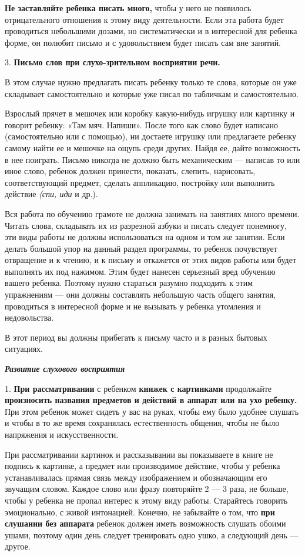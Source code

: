 \documentclass[a5paper]{book}
\renewcommand{\emph}[1]{\textit{#1}}
\begin{document}
\textbf{Не заставляйте ребенка писать много,} чтобы у него не появилось
отрицательного отношения к этому виду деятельности. Если эта работа
будет проводиться небольшими дозами, но систематически и в интересной
для ребенка форме, он полюбит письмо и с удовольствием будет писать сам
вне занятий.

3. \textbf{Письмо слов при слухо-зрительном восприятии речи.}

В этом случае нужно предлагать писать ребенку только те слова, которые
он уже складывает самостоятельно и которые уже писал по табличкам и
самостоятельно.

Взрослый прячет в мешочек или коробку какую-нибудь игрушку или картинку
и говорит ребенку: «Там мяч. Напиши». После того как слово будет
написано (самостоятельно или с помощью), ни достаете игрушку или
предлагаете ребенку самому найти ее и мешочке на ощупь среди других.
Найдя ее, дайте возможность в нее поиграть. Письмо никогда не должно
быть механическим --- написав то или иное слово, ребенок должен
принести, показать, слепить, нарисовать, соответствующий предмет,
сделать аппликацию, постройку или выполнить действие \emph{(спи, иди} и
др.).

Вся работа по обучению грамоте не должна занимать на занятиях много
времени. Читать слова, складывать их из разрезной азбуки и писать
следует понемногу, эти виды работы не должны использоваться на одном и
том же занятии. Если делать большой упор на данный раздел программы, то
ребенок почувствует отвращение и к чтению, и к письму и откажется от
этих видов работы или будет выполнять их под нажимом. Этим будет нанесен
серьезный вред обучению вашего ребенка. Поэтому нужно стараться разумно
подходить к этим упражнениям --- они должны составлять небольшую часть
общего занятия, проводиться в интересной форме и не вызывать у ребенка
утомления и недовольства.

В этот период вы должны прибегать к письму часто и в разных бытовых
ситуациях.

\emph{\textbf{Развитие слухового восприятия}}

1. \textbf{При рассматривании} с ребенком \textbf{книжек с картинками}
продолжайте \textbf{произносить названия предметов и действий в аппарат
или на ухо ребенку.} При этом ребенок может сидеть у вас на руках, чтобы
ему было удобнее слушать и чтобы в то же время сохранялась
естественность общения, чтобы не было напряжения и искусственности.

При рассматривании картинок и рассказывании вы показываете в книге не
подпись к картинке, а предмет или производимое действие, чтобы у ребенка
устанавливалась прямая связь между изображением и обозначающим его
звучащим словом. Каждое слово или фразу повторяйте 2 --- 3 раза, не
больше, чтобы у ребенка не пропал интерес к этому виду работы.
Старайтесь говорить эмоционально, с живой интонацией. Конечно, не
забывайте о том, что \textbf{при слушании без аппарата} ребенок должен
иметь возможность слушать обоими ушами, поэтому один день следует
тренировать одно ушко, а следующий день --- другое.
\end{document}
